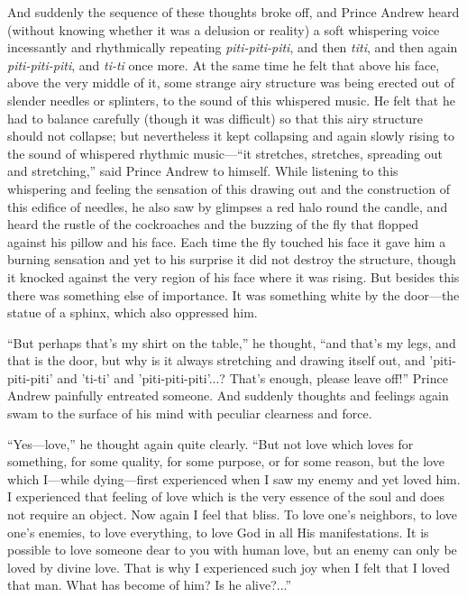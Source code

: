 And suddenly the sequence of these thoughts broke off, and Prince
Andrew heard (without knowing whether it was a delusion or
reality) a soft whispering voice incessantly and rhythmically
repeating \emph{piti-piti-piti}, and then \emph{titi}, and then
again \emph{piti-piti-piti}, and \emph{ti-ti} once more. At the
same time he felt that above his face, above the very middle of
it, some strange airy structure was being erected out of slender
needles or splinters, to the sound of this whispered music. He
felt that he had to balance carefully (though it was difficult)
so that this airy structure should not collapse; but nevertheless
it kept collapsing and again slowly rising to the sound of
whispered rhythmic music---``it stretches, stretches, spreading
out and stretching,'' said Prince Andrew to himself. While
listening to this whispering and feeling the sensation of this
drawing out and the construction of this edifice of needles, he
also saw by glimpses a red halo round the candle, and heard the
rustle of the cockroaches and the buzzing of the fly that flopped
against his pillow and his face. Each time the fly touched his
face it gave him a burning sensation and yet to his surprise it
did not destroy the structure, though it knocked against the very
region of his face where it was rising. But besides this there
was something else of importance. It was something white by the
door---the statue of a sphinx, which also oppressed him.

``But perhaps that's my shirt on the table,'' he thought, ``and
that's my legs, and that is the door, but why is it always
stretching and drawing itself out, and 'piti-piti-piti' and
'ti-ti' and 'piti-piti-piti'...?  That's enough, please leave
off!'' Prince Andrew painfully entreated someone. And suddenly
thoughts and feelings again swam to the surface of his mind with
peculiar clearness and force.

``Yes---love,'' he thought again quite clearly. ``But not love
which loves for something, for some quality, for some purpose, or
for some reason, but the love which I---while dying---first
experienced when I saw my enemy and yet loved him. I experienced
that feeling of love which is the very essence of the soul and
does not require an object. Now again I feel that bliss. To love
one's neighbors, to love one's enemies, to love everything, to
love God in all His manifestations. It is possible to love
someone dear to you with human love, but an enemy can only be
loved by divine love. That is why I experienced such joy when I
felt that I loved that man. What has become of him? Is he
alive?...''

